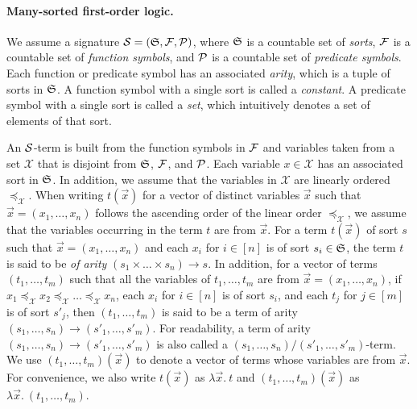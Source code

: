 
\hide
{

\paragraph{Many-sorted first-order logic.}
We assume a signature $\mathcal{S}=({\mathfrak{S}}, {\mathcal{F}}, {\mathcal{P}})$, where ${\mathfrak{S}}$ is a countable set of \emph{sorts}, ${\mathcal{F}}$ is a countable set of \emph{function symbols}, and ${\mathcal{P}}$ is a countable set of \emph{predicate symbols}. Each function or predicate symbol has an associated \emph{arity}, which is a tuple of sorts in ${\mathfrak{S}}$.  A function symbol with a single sort is called a \emph{constant}. A predicate symbol with a single sort is called a \emph{set}, which intuitively denotes a set of elements of that sort.

An $\mathcal{S}$-term is built from the function symbols in ${\mathcal{F}}$ and variables taken from a set $\mathcal{X}$ that is disjoint from ${\mathfrak{S}}$, ${\mathcal{F}}$, and ${\mathcal{P}}$. Each variable $x \in \mathcal{X}$ has an associated sort in ${\mathfrak{S}}$. In addition, we assume that the variables in $\mathcal{X}$ are linearly ordered $\preceq_{\mathcal{X}}$. When writing $t(\vec{x})$ for a vector of distinct variables $\vec{x}$ such that $\vec{x} = (x_1,\dots, x_n)$ follows the ascending order of the linear order $\preceq_{\mathcal{X}}$, we assume that the variables occurring in the term $t$ are from $\vec{x}$. For a term $t(\vec{x})$ of sort $s$ such that $\vec{x} = (x_1, \dots, x_n)$ and each $x_i$ for $i \in [n]$ is of sort $s_i \in {\mathfrak{S}}$, the term $t$ is said to be \emph{of arity} $(s_1 \times \dots \times s_n) \rightarrow s$. In addition, for a vector of terms $(t_1, \dots, t_m)$ such that all the variables of $t_1 ,\dots, t_m$ are from $\vec{x} = (x_1, \dots, x_n)$, if $x_1 \preceq_{\mathcal{X}} x_2  \preceq_{\mathcal{X}} \dots  \preceq_{\mathcal{X}} x_n$, each $x_i$ for $i \in [n]$ is of sort $s_i$, and each $t_j$ for $j \in [m]$ is of sort $s'_j$, then $(t_1,\dots, t_m)$ is said to be a term of arity $(s_1,\dots, s_n) \rightarrow (s'_1,\dots, s'_m)$. For readability, a term of arity $(s_1,\dots, s_n) \rightarrow (s'_1,\dots, s'_m)$ is also called a $(s_1,\dots, s_n) \big/ (s'_1,\dots, s'_m)$-term. We use $(t_1,\dots, t_m)(\vec{x})$ to denote a vector of terms whose variables are from $\vec{x}$.  For convenience, we also write $t(\vec{x})$ as $\lambda \vec{x}.\ t$ and $(t_1,\dots, t_m)(\vec{x})$ as $\lambda \vec{x}.\ (t_1,\dots, t_m)$. 

}
